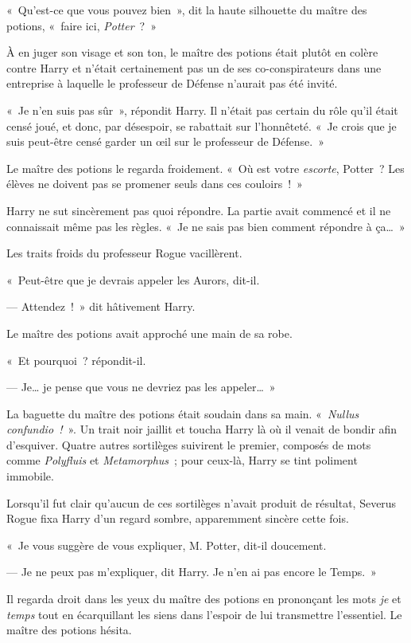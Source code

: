 «~Qu'est-ce que vous pouvez bien~», dit la haute silhouette du maître des potions, «~faire ici, \emph{Potter}~?~»

À en juger son visage et son ton, le maître des potions était plutôt en colère contre Harry et n'était certainement pas un de ses co-conspirateurs dans une entreprise à laquelle le professeur de Défense n'aurait pas été invité.

«~Je n'en suis pas sûr~», répondit Harry. Il n'était pas certain du rôle qu'il était censé joué, et donc, par désespoir, se rabattait sur l'honnêteté. «~Je crois que je suis peut-être censé garder un œil sur le professeur de Défense.~»

Le maître des potions le regarda froidement. «~Où est votre \emph{escorte}, Potter~? Les élèves ne doivent pas se promener seuls dans ces couloirs~!~»

Harry ne sut sincèrement pas quoi répondre. La partie avait commencé et il ne connaissait même pas les règles. «~Je ne sais pas bien comment répondre à ça…~»

Les traits froids du professeur Rogue vacillèrent.

«~Peut-être que je devrais appeler les Aurors, dit-il.

--- Attendez~!~» dit hâtivement Harry.

Le maître des potions avait approché une main de sa robe.

«~Et pourquoi~? répondit-il.

--- Je… je pense que vous ne devriez pas les appeler…~»

La baguette du maître des potions était soudain dans sa main. «~\emph{Nullus confundio~!}~». Un trait noir jaillit et toucha Harry là où il venait de bondir afin d'esquiver. Quatre autres sortilèges suivirent le premier, composés de mots comme \emph{Polyfluis} et \emph{Metamorphus}~; pour ceux-là, Harry se tint poliment immobile.

Lorsqu'il fut clair qu'aucun de ces sortilèges n'avait produit de résultat, Severus Rogue fixa Harry d'un regard sombre, apparemment sincère cette fois.

«~Je vous suggère de vous expliquer, M. Potter, dit-il doucement.

--- Je ne peux pas m'expliquer, dit Harry. Je n'en ai pas encore le Temps.~»

Il regarda droit dans les yeux du maître des potions en prononçant les mots \emph{je} et \emph{temps} tout en écarquillant les siens dans l'espoir de lui transmettre l'essentiel. Le maître des potions hésita.

